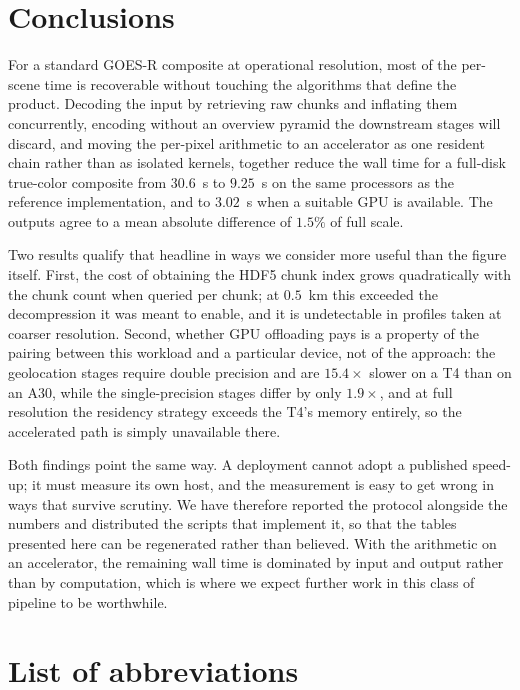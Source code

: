 \documentclass[11pt]{article}
\begin{document}
\section{Conclusions}
\label{sec:conclusions}

For a standard GOES-R composite at operational resolution, most of the
per-scene time is recoverable without touching the algorithms that define the
product. Decoding the input by retrieving raw chunks and inflating them
concurrently, encoding without an overview pyramid the downstream stages will
discard, and moving the per-pixel arithmetic to an accelerator as one resident
chain rather than as isolated kernels, together reduce the wall time for a
full-disk true-color composite from $30.6$~s to $9.25$~s on the same processors
as the reference implementation, and to $3.02$~s when a suitable GPU is
available. The outputs agree to a mean absolute difference of $1.5\%$ of full
scale.

Two results qualify that headline in ways we consider more useful than the
figure itself. First, the cost of obtaining the HDF5 chunk index grows
quadratically with the chunk count when queried per chunk; at $0.5$~km this
exceeded the decompression it was meant to enable, and it is undetectable in
profiles taken at coarser resolution. Second, whether GPU offloading pays is a
property of the pairing between this workload and a particular device, not of
the approach: the geolocation stages require double precision and are
$15.4\times$ slower on a T4 than on an A30, while the single-precision stages
differ by only $1.9\times$, and at full resolution the residency strategy
exceeds the T4's memory entirely, so the accelerated path is simply
unavailable there.

Both findings point the same way. A deployment cannot adopt a published
speed-up; it must measure its own host, and the measurement is easy to get
wrong in ways that survive scrutiny. We have therefore reported the protocol
alongside the numbers and distributed the scripts that implement it, so that
the tables presented here can be regenerated rather than believed. With the
arithmetic on an accelerator, the remaining wall time is dominated by input and
output rather than by computation, which is where we expect further work in
this class of pipeline to be worthwhile.


\section*{List of abbreviations}
\end{document}
